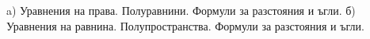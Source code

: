 a) Уравнения на права. Полуравнини. Формули за разстояния и ъгли.
б) Уравнения на равнина. Полупространства. Формули за разстояния и ъгли.